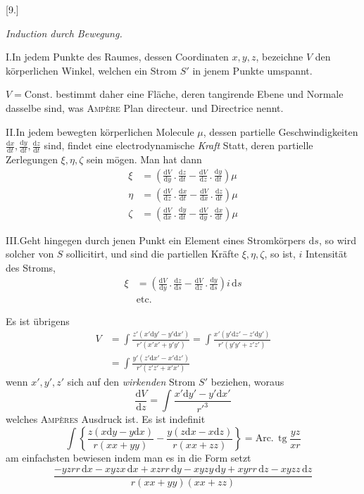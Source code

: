 \begin{center}[9.]\par\medskip\textit{Induction durch Bewegung.}\end{center}
I.\quad In jedem Punkte des Raumes, dessen Coordinaten $x,y,z$, bezeichne $V$ den körperlichen Winkel, welchen ein Strom $S'$ in jenem Punkte umspannt.

$V=\text{Const.}$ bestimmt daher eine Fläche, deren tangirende Ebene und Normale dasselbe sind, was \textsc{Ampère} Plan directeur. und Directrice nennt.

II.\quad In jedem bewegten körperlichen Molecule $\mu$, dessen partielle Geschwin\-digkeiten $\frac{\mathrm dx}{\mathrm dt},\frac{\mathrm dy}{\mathrm dt},\frac{\mathrm dz}{\mathrm dt}$ sind, findet eine electrodynamische \textit{Kraft} Statt, deren partielle Zerlegungen $\xi,\eta,\zeta$ sein mögen. Man hat dann
\[
\begin{aligned}
\xi&=\left(\frac{\mathrm dV}{\mathrm dy}\,.\,\frac{\mathrm dz}{\mathrm dt}-\frac{\mathrm dV}{\mathrm dz}\,.\,\frac{\mathrm dy}{\mathrm dt}\right)\mu\\[4pt]
\eta&=\left(\frac{\mathrm dV}{\mathrm dz}\,.\,\frac{\mathrm dx}{\mathrm dt}-\frac{\mathrm dV}{\mathrm dx}\,.\,\frac{\mathrm dz}{\mathrm dt}\right)\mu\\[4pt]
\zeta&=\left(\frac{\mathrm dV}{\mathrm dx}\,.\,\frac{\mathrm dy}{\mathrm dt}-\frac{\mathrm dV}{\mathrm dy}\,.\,\frac{\mathrm dx}{\mathrm dt}\right)\mu
\end{aligned}
\]

III.\quad Geht hingegen durch jenen Punkt ein Element eines Stromkörpers $\mathrm ds$, so wird solcher von $S$ sollicitirt, und sind die partiellen Kräfte $\xi,\eta,\zeta$, so ist, $i$ Intensität des Stroms,
\[
\begin{aligned}
\xi&=\left(\frac{\mathrm dV}{\mathrm dy}\,.\,\frac{\mathrm dz}{\mathrm ds}-\frac{\mathrm dV}{\mathrm dz}\,.\,\frac{\mathrm dy}{\mathrm ds}\right)i\,\mathrm ds\\
&\text{etc.}
\end{aligned}
\]

Es ist übrigens
\[
\begin{aligned}
V&=\int\frac{z'(x'\mathrm dy'-y'\mathrm dx')}{r'(x'x'+y'y')}=\int\frac{x'(y'\mathrm dz'-z'\mathrm dy')}{r'(y'y'+z'z')}\\
&=\int\frac{y'(z'\mathrm dx'-x'\mathrm dz')}{r'(z'z'+x'x')}
\end{aligned}
\]
wenn $x',y',z'$ sich auf den \textit{wirkenden} Strom $S'$ beziehen, woraus
\[
\frac{\mathrm dV}{\mathrm dz}=\int\frac{x'\mathrm dy'-y'\mathrm dx'}{r'^3}
\]
welches \textsc{Ampères} Ausdruck ist. Es ist indefinit
\[
\int\left\{\frac{z(x\mathrm dy-y\mathrm dx)}{r(xx+yy)}-\frac{y(z\mathrm dx-x\mathrm dz)}{r(xx+zz)}\right\}=\text{Arc.}\,\operatorname{tg}\frac{yz}{xr}
\]
am einfachsten bewiesen indem man es in die Form setzt
\[
\frac{-yzrr\,\mathrm dx-xyzx\,\mathrm dx+xzrr\,\mathrm dy-xyzy\,\mathrm dy+xyrr\,\mathrm dz-xyzz\,\mathrm dz}{r(xx+yy)(xx+zz)}
\]

